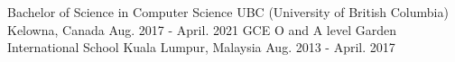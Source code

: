 \vspace{-1ex}

\begin{cventries}

  \cventry
    {Bachelor of Science in Computer Science} %
    {UBC (University of British Columbia)} %
    {Kelowna, Canada} %
    {Aug. 2017 - April. 2021} %
     {
     \vspace{-5ex}
    }
    \vspace{-2ex}
      \cventry
    {GCE  O and A level } %
    {Garden International School} %
    {Kuala Lumpur, Malaysia } %
    {Aug. 2013 - April. 2017} %
     {
     \vspace{-5ex}
    }
\vspace{-5ex}
\end{cventries}